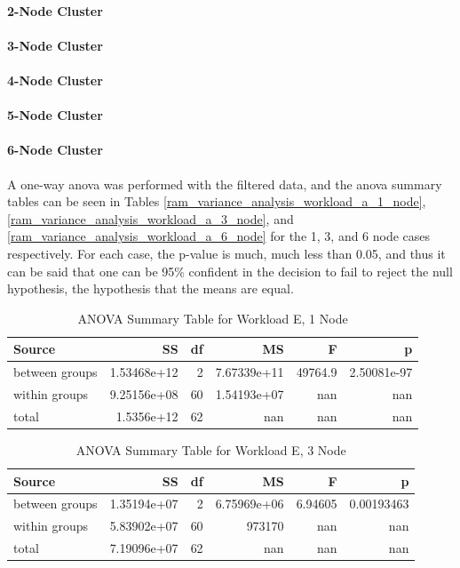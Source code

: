 \paragraph{2-Node Cluster}
\paragraph{3-Node Cluster}
\paragraph{4-Node Cluster}
\paragraph{5-Node Cluster}
\paragraph{6-Node Cluster}

A one-way \gls{anova} was performed with the filtered data, and the \gls{anova} summary tables can be seen in Tables \ref{ram_variance_analysis_workload_a_1_node}, \ref{ram_variance_analysis_workload_a_3_node}, and \ref{ram_variance_analysis_workload_a_6_node} for the 1, 3, and 6 node cases respectively.  For each case, the  p-value is much, much less than 0.05, and thus it can be said that one can be 95\% confident in the decision to fail to reject the null hypothesis, the hypothesis that the means are equal.

\begin{table}
\begin{tabular}{lrrrrr}
\toprule
         Source &          SS &  df &          MS &       F &           p \\
\midrule
 between groups & 1.53468e+12 &   2 & 7.67339e+11 & 49764.9 & 2.50081e-97 \\
  within groups & 9.25156e+08 &  60 & 1.54193e+07 &     nan &         nan \\
          total &  1.5356e+12 &  62 &         nan &     nan &         nan \\
\bottomrule
\end{tabular}
\caption{ANOVA Summary Table for Workload E, 1 Node}
\label{table:ram_variance_analysis_workload_e_1_node}
\end{table}

\begin{table}
\begin{tabular}{lrrrrr}
\toprule
         Source &          SS &  df &          MS &       F &          p \\
\midrule
 between groups & 1.35194e+07 &   2 & 6.75969e+06 & 6.94605 & 0.00193463 \\
  within groups & 5.83902e+07 &  60 &      973170 &     nan &        nan \\
          total & 7.19096e+07 &  62 &         nan &     nan &        nan \\
\bottomrule
\end{tabular}
\caption{ANOVA Summary Table for Workload E, 3 Node}
\label{table:ram_variance_analysis_workload_e_3_node}
\end{table}

